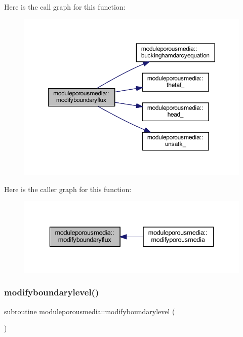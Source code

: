 Here is the call graph for this function\+:\nopagebreak
\begin{figure}[H]
\begin{center}
\leavevmode
\includegraphics[width=350pt]{namespacemoduleporousmedia_a38214dbc89926ed05dfa7d3831f6fc5a_cgraph}
\end{center}
\end{figure}
Here is the caller graph for this function\+:\nopagebreak
\begin{figure}[H]
\begin{center}
\leavevmode
\includegraphics[width=336pt]{namespacemoduleporousmedia_a38214dbc89926ed05dfa7d3831f6fc5a_icgraph}
\end{center}
\end{figure}
\mbox{\label{namespacemoduleporousmedia_a92e9c5aa327b8fb0f60c057a8885230d}} 
\subsubsection{\texorpdfstring{modifyboundarylevel()}{modifyboundarylevel()}}
{\footnotesize\ttfamily subroutine moduleporousmedia\+::modifyboundarylevel (\begin{DoxyParamCaption}{ }\end{DoxyParamCaption})\hspace{0.3cm}{\ttfamily [private]}}

